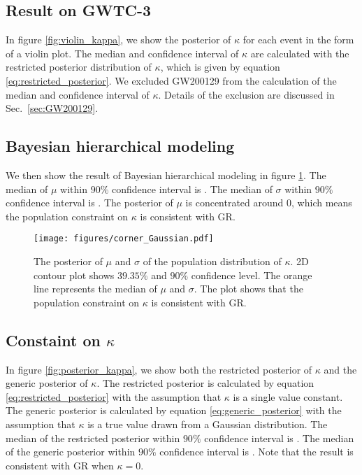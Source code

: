 \documentclass[aps,prd,twocolumn,superscriptaddress,preprintnumbers,floatfix,nofootinbib]{revtex4-2}
\begin{document}
\subsection{Result on GWTC-3}
In figure \ref{fig:violin_kappa}, we show the posterior of $\kappa$ for each event in the form of a violin plot.
The median and confidence interval of $\kappa$ are calculated with the restricted posterior distribution of $\kappa$, which is given by equation \ref{eq:restricted_posterior}.
We excluded GW200129 from the calculation of the median and confidence interval of $\kappa$.
Details of the exclusion are discussed in Sec.~\ref{sec:GW200129}.

\subsection{Bayesian hierarchical modeling}
We then show the result of Bayesian hierarchical modeling in figure \ref{fig:corner_Gaussian}.
The median of $\mu$ within $90\%$ confidence interval is .
The median of $\sigma$ within $90\%$ confidence interval is .
The posterior of $\mu$ is concentrated around $0$, which means the population constraint on $\kappa$ is consistent with GR.

\begin{figure}
    \texttt{[image: figures/corner\_Gaussian.pdf]}
    \caption{
        The posterior of $\mu$ and $\sigma$ of the population distribution of $\kappa$.
        2D contour plot shows $39.35\%$ and $90\%$ confidence level.
        The orange line represents the median of $\mu$ and $\sigma$.
        The plot shows that the population constraint on $\kappa$ is consistent with GR.
    }
    \label{fig:corner_Gaussian}
\end{figure}

\subsection{Constaint on $\kappa$}
In figure \ref{fig:posterior_kappa}, we show both the restricted posterior of $\kappa$ and the generic posterior of $\kappa$.
The restricted posterior is calculated by equation \ref{eq:restricted_posterior} with the assumption that $\kappa$ is a single value constant.
The generic posterior is calculated by equation \ref{eq:generic_posterior} with the assumption that $\kappa$ is a true value drawn from a Gaussian distribution.
The median of the restricted posterior within $90\%$ confidence interval is .
The median of the generic posterior within $90\%$ confidence interval is .
Note that the result is consistent with GR when $\kappa=0$.
\end{document}
